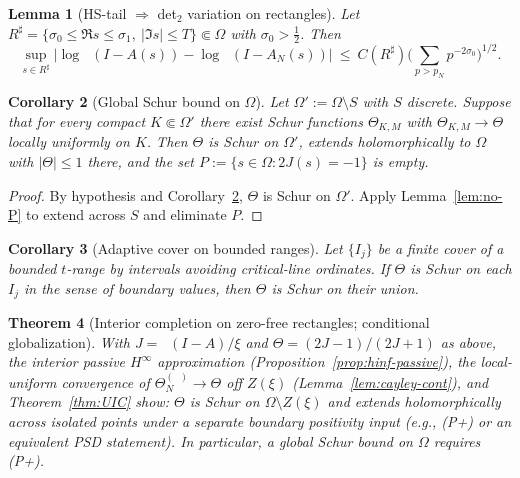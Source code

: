 \documentclass[11pt]{article}
\newtheorem{theorem}{Theorem}
\newtheorem{lemma}[theorem]{Lemma}
\newtheorem{corollary}[theorem]{Corollary}
\theoremstyle{definition}
\theoremstyle{remark}
\DeclareMathOperator{\dettwo}{det_2}
\begin{document}
\begin{lemma}[HS-tail \(\Rightarrow\) det$_2$ variation on rectangles]\label{lem:HS-tail-rectangle}
Let \(R^\sharp=\{\sigma_0\le \Re s\le \sigma_1,\ |\Im s|\le T\}\Subset\Omega\) with \(\sigma_0>\tfrac12\). Then
\[
 \sup_{s\in R^\sharp}\big|\log\dettwo(I-A(s))\!-\!\log\dettwo(I-A_N(s))\big|\ \le\ C(R^\sharp)\Big(\sum_{p>p_N}p^{-2\sigma_0}\Big)^{1/2}.
\]
\end{lemma}
\begin{corollary}[Global Schur bound on \(\Omega\)]\label{cor:closure}
Let \(\Omega':=\Omega\setminus S\) with \(S\) discrete. Suppose that for every compact \(K\Subset\Omega'\) there exist Schur functions \(\Theta_{K,M}\) with \(\Theta_{K,M}\to\Theta\) locally uniformly on \(K\). Then \(\Theta\) is Schur on \(\Omega'\), extends holomorphically to \(\Omega\) with \(|\Theta|\le 1\) there, and the set \(P:=\{s\in\Omega: 2J(s)=-1\}\) is empty.
\end{corollary}
\begin{proof}
By hypothesis and Corollary~\ref{cor:closure}, \(\Theta\) is Schur on \(\Omega'\). Apply Lemma~\ref{lem:no-P} to extend across \(S\) and eliminate \(P\). 
\end{proof}
\begin{corollary}[Adaptive cover on bounded ranges]\label{cor:adaptive-cover}
Let \(\{I_j\}\) be a finite cover of a bounded $t$-range by intervals avoiding critical-line ordinates. If \(\Theta\) is Schur on each \(I_j\) in the sense of boundary values, then \(\Theta\) is Schur on their union.
\end{corollary}
\begin{theorem}[Interior completion on zero-free rectangles; conditional globalization]\label{thm:global-PSD}
With \(J=\dettwo(I-A)/\xi\) and \(\Theta=(2J-1)/(2J+1)\) as above, the interior passive \(H^\infty\) approximation (Proposition~\ref{prop:hinf-passive}), the local-uniform convergence of \(\Theta_N^{(\dettwo)}\to\Theta\) off \(Z(\xi)\) (Lemma~\ref{lem:cayley-cont}), and Theorem~\ref{thm:UIC} show: \(\Theta\) is Schur on \(\Omega\setminus Z(\xi)\) and extends holomorphically across isolated points under a separate boundary positivity input (e.g., (P+) or an equivalent PSD statement). In particular, a global Schur bound on \(\Omega\) requires (P+). 
\end{theorem}
\end{document}
